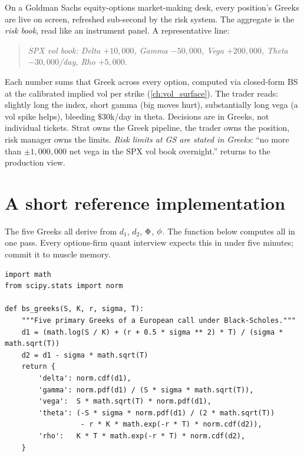 \begin{gsbox}
On a Goldman Sachs equity-options market-making desk, every
position's Greeks are live on screen, refreshed sub-second by the
risk system. The aggregate is the \emph{risk book}, read like an
instrument panel. A representative line:
\begin{quote}\itshape
SPX vol book: Delta $+10{,}000$, Gamma $-50{,}000$, Vega
$+200{,}000$, Theta $-30{,}000$/day, Rho $+5{,}000$.
\end{quote}
Each number sums that Greek across every option, computed via
closed-form BS at the calibrated implied vol per strike
(\cref{ch:vol_surface}). The trader reads: slightly long the
index, short gamma (big moves hurt), substantially long vega (a
vol spike helps), bleeding $\$30$k/day in theta. Decisions are in
Greeks, not individual tickets. Strat owns the Greek pipeline, the
trader owns the position, risk manager owns the limits. \emph{Risk
limits at GS are stated in Greeks}: ``no more than $\pm 1{,}000{,}000$
net vega in the SPX vol book overnight.''
 returns to the production view.
\end{gsbox}

\section{A short reference implementation}
\label{sec:ch16_code}

The five Greeks all derive from $d_1$, $d_2$, $\Phi$, $\phi$.
The function below computes all in one pass. Every options-firm
quant interview expects this in under five minutes; commit it to
muscle memory.

\begin{lstlisting}[caption={Black--Scholes Greeks for a European call on a non-dividend-paying stock. Returns a dict of the five primary Greeks. No side effects, no plotting, no persistence. Calling \texttt{bs\_greeks(100, 100, 0.05, 0.20, 1.0)} returns delta $\approx 0.6368$, gamma $\approx 0.01876$, vega $\approx 37.52$, theta $\approx -6.414$ per year, rho $\approx 53.23$.}]
import math
from scipy.stats import norm

def bs_greeks(S, K, r, sigma, T):
    """Five primary Greeks of a European call under Black-Scholes."""
    d1 = (math.log(S / K) + (r + 0.5 * sigma ** 2) * T) / (sigma * math.sqrt(T))
    d2 = d1 - sigma * math.sqrt(T)
    return {
        'delta': norm.cdf(d1),
        'gamma': norm.pdf(d1) / (S * sigma * math.sqrt(T)),
        'vega':  S * math.sqrt(T) * norm.pdf(d1),
        'theta': (-S * sigma * norm.pdf(d1) / (2 * math.sqrt(T))
                  - r * K * math.exp(-r * T) * norm.cdf(d2)),
        'rho':   K * T * math.exp(-r * T) * norm.cdf(d2),
    }
\end{lstlisting}

